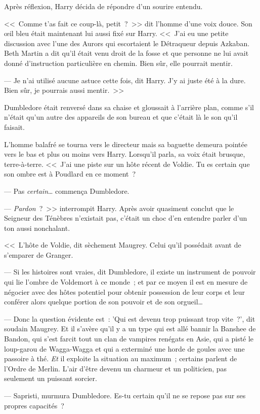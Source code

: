 Après réflexion, Harry décida de répondre d'un sourire entendu.

<<~Comme t'as fait ce coup-là, petit~?~>> dit l'homme d'une voix douce. Son œil bleu était maintenant lui aussi fixé sur Harry. <<~J'ai eu une petite discussion avec l'une des Aurors qui escortaient le Détraqueur depuis Azkaban. Beth Martin a dit qu'il était venu droit de la fosse et que personne ne lui avait donné d'instruction particulière en chemin. Bien sûr, elle pourrait mentir.

--- Je n'ai utilisé aucune astuce cette fois, dit Harry. J'y ai juste été à la dure. Bien sûr, je pourrais aussi mentir.~>>

Dumbledore était renversé dans sa chaise et gloussait à l'arrière plan, comme s'il n'était qu'un autre des appareils de son bureau et que c'était là le son qu'il faisait.

L'homme balafré se tourna vers le directeur mais sa baguette demeura pointée vers le bas et plus ou moins vers Harry. Lorsqu'il parla, sa voix était brusque, terre-à-terre. <<~J'ai une piste sur un hôte récent de Voldie. Tu es certain que son ombre est à Poudlard en ce moment~?

--- Pas \emph{certain}… commença Dumbledore.

--- \emph{Pardon}~?~>> interrompit Harry. Après avoir quasiment conclut que le Seigneur des Ténèbres n'existait pas, c'était un choc d'en entendre parler d'un ton aussi nonchalant.

<<~L'hôte de Voldie, dit sèchement Maugrey. Celui qu'il possédait avant de s'emparer de Granger.

--- Si les histoires sont vraies, dit Dumbledore, il existe un instrument de pouvoir qui lie l'ombre de Voldemort à ce monde~; et par ce moyen il est en mesure de négocier avec des hôtes potentiel pour obtenir possession de leur corps et leur conférer alors quelque portion de son pouvoir et de son orgueil…

--- Donc la question évidente est~: 'Qui est devenu trop puissant trop vite~?', dit soudain Maugrey. Et il s'avère qu'il y a un type qui est allé bannir la Banshee de Bandon, qui s'est farcit tout un clan de vampires renégats en Asie, qui a pisté le loup-garou de Wagga-Wagga et qui a exterminé une horde de goules avec une passoire à thé. \emph{Et} il exploite la situation au maximum~; certains parlent de l'Ordre de Merlin. L'air d'être devenu un charmeur et un politicien, pas seulement un puissant sorcier.

--- Sapristi, murmura Dumbledore. Es-tu certain qu'il ne se repose pas sur ses propres capacités~?

